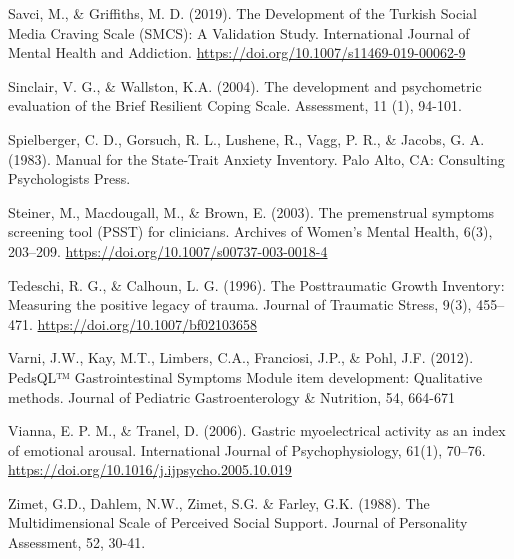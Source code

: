 \documentclass[]{book}
\begin{document}
Savci, M., \& Griffiths, M. D. (2019). The Development of the Turkish Social Media Craving Scale (SMCS): A Validation Study. International Journal of Mental Health and Addiction. \url{https://doi.org/10.1007/s11469-019-00062-9}

Sinclair, V. G., \& Wallston, K.A. (2004). The development and psychometric evaluation of the Brief Resilient Coping Scale. Assessment, 11 (1), 94-101.

Spielberger, C. D., Gorsuch, R. L., Lushene, R., Vagg, P. R., \& Jacobs, G. A. (1983). Manual for the State-Trait Anxiety Inventory. Palo Alto, CA: Consulting Psychologists Press.

Steiner, M., Macdougall, M., \& Brown, E. (2003). The premenstrual symptoms screening tool (PSST) for clinicians. Archives of Women's Mental Health, 6(3), 203--209. \url{https://doi.org/10.1007/s00737-003-0018-4}

Tedeschi, R. G., \& Calhoun, L. G. (1996). The Posttraumatic Growth Inventory: Measuring the positive legacy of trauma. Journal of Traumatic Stress, 9(3), 455--471. \url{https://doi.org/10.1007/bf02103658}

Varni, J.W., Kay, M.T., Limbers, C.A., Franciosi, J.P., \& Pohl, J.F. (2012). PedsQL™ Gastrointestinal Symptoms Module item development: Qualitative methods. Journal of Pediatric Gastroenterology \& Nutrition, 54, 664-671

Vianna, E. P. M., \& Tranel, D. (2006). Gastric myoelectrical activity as an index of emotional arousal. International Journal of Psychophysiology, 61(1), 70--76. \url{https://doi.org/10.1016/j.ijpsycho.2005.10.019}

Zimet, G.D., Dahlem, N.W., Zimet, S.G. \& Farley, G.K. (1988). The Multidimensional Scale of
Perceived Social Support. Journal of Personality Assessment, 52, 30-41.
\end{document}
